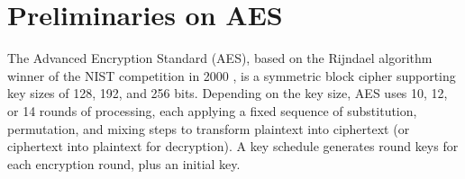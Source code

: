  
\section{Preliminaries on AES}
\label{sec:preliminaries_aes}

The Advanced Encryption Standard (\gls{AES}), based on the Rijndael algorithm winner of the NIST competition in 2000 \cite{aes-original}, is a symmetric block cipher supporting key sizes of 128, 192, and 256 bits. Depending on the key size, \gls{AES} uses 10, 12, or 14 rounds of processing, each applying a fixed sequence of substitution, permutation, and mixing steps to transform plaintext into ciphertext (or ciphertext into plaintext for decryption). A key schedule generates round keys for each encryption round, plus an initial key.

